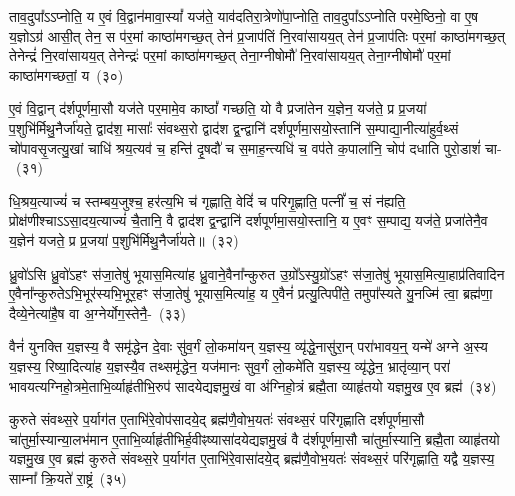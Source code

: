 ताव॒दुपा᳚\-ऽऽ\-प्नोति॒ य ए॒वं वि॒द्वान॑मावा॒स्यां᳚ यज॑ते॒ याव॑दतिरा॒त्रेणो॑पा॒प्नोति॒ ताव॒दुपा᳚\-ऽऽ\-प्नोति परमे॒ष्ठिनो॒ वा ए॒ष य॒ज्ञो\-ऽग्र॑ आसी॒त् तेन॒ स प॑र॒मां काष्ठा॑मगच्छ॒त् तेन॑ प्र॒जा\-प॑तिं नि॒रवा॑सायय॒त् तेन॑ प्र॒जा\-प॑तिः पर॒मां काष्ठा॑मगच्छ॒त् तेनेन्द्रं॑ नि॒रवा॑सायय॒त् तेनेन्द्रः॑ पर॒मां काष्ठा॑मगच्छ॒त् तेना॒ग्नी\-षोमौ॑ नि॒रवा॑सायय॒त् तेना॒ग्नी\-षोमौ॑ पर॒मां काष्ठा॑मगच्छतां॒ य~(३०)\ip

ए॒वं वि॒द्वान् द॑र्\mbox{}शपूर्णमा॒सौ यज॑ते पर॒मामे॒व काष्ठां᳚ गच्छति॒ यो वै प्रजा॑तेन य॒ज्ञेन॒ यज॑ते॒ प्र प्र॒जया॑ प॒शुभि॑र्मिथु॒नैर्जा॑यते॒ द्वाद॑श॒ मासाः᳚ संवथ्स॒रो द्वाद॑श द्व॒न्द्वानि॑ दर्\mbox{}श\-पूर्ण\-मा॒सयो॒स्तानि॑ स॒म्पाद्या॒नीत्या॑हुर्व॒थ्सं चो॑पावसृ॒जत्यु॒खां चाधि॑ श्रय॒त्यव॑ च॒ हन्ति॑ दृ॒षदौ॑ च स॒माह॒न्त्यधि॑ च॒ वप॑ते क॒पाला॑नि॒ चोप॑ दधाति पुरो॒डाशं॑ चा-~(३१)\ip

धि॒श्रय॒त्याज्यं॑ च स्तम्बय॒जुश्च॒ हर॑त्य॒भि च॑ गृह्णाति॒ वेदिं॑ च परिगृ॒ह्णाति॒ पत्नीं᳚ च॒ सं न॑ह्यति॒ प्रोक्ष॑णीश्चा\-ऽऽ\-सा॒दय॒त्याज्यं॑ चै॒तानि॒ वै द्वाद॑श द्व॒न्द्वानि॑ दर्\mbox{}श\-पूर्ण\-मा॒सयो॒स्तानि॒ य ए॒वꣳ स॒म्पाद्य॒ यज॑ते॒ प्रजा॑तेनै॒व य॒ज्ञेन॑ यजते॒ प्र प्र॒जया॑ प॒शुभि॑र्मिथु॒नैर्जा॑यते॥~(३२)\ip

{\anuvakamend[{उ॒क्थ्ये॑नोपा॒प्नोत्य॑गच्छतां॒ यः पु॑रो॒डाशं॑ च चत्वारि॒ꣳ॒शच्च॑}]}

ध्रु॒वो॑\-ऽसि ध्रु॒वो॑\-ऽहꣳ स॑जा॒तेषु॑ भूयास॒मित्या॑ह ध्रु॒वाने॒वैना᳚न्कुरुत उ॒ग्रो᳚\-ऽस्यु॒ग्रो॑\-ऽहꣳ स॑जा॒तेषु॑ भूयास॒मित्या॒हाप्र॑तिवादिन ए॒वैना᳚न्कुरुते\-ऽभि॒भूर॑स्यभि॒भूर॒हꣳ स॑जा॒तेषु॑ भूयास॒मित्या॑ह॒ य ए॒वैनं॑ प्रत्यु॒त्पिपी॑ते॒ तमुपा᳚स्यते यु॒नज्मि॑ त्वा॒ ब्रह्म॑णा॒ दैव्ये॒नेत्या॑है॒ष वा अ॒ग्नेर्योग॒स्तेनै॒-~(३३)\ip

वैनं॑ युनक्ति य॒ज्ञस्य॒ वै समृ॑द्धेन दे॒वाः सु॑व॒र्गं लो॒कमा॑यन् य॒ज्ञस्य॒ व्यृ॑द्धे॒नासु॑रा॒न् परा॑भावय॒न्॒ यन्मे॑ अग्ने अ॒स्य य॒ज्ञस्य॒ रिष्या॒दित्या॑ह य॒ज्ञस्यै॒व तथ्समृ॑द्धेन॒ यज॑मानः सुव॒र्गं लो॒कमे॑ति य॒ज्ञस्य॒ व्यृ॑द्धेन॒ भ्रातृ॑व्या॒न् परा॑ भावयत्यग्नि\-हो॒त्रमे॒ताभि॒र्व्याहृ॑तीभि॒\-रुप॑ सादयेद्यज्ञमु॒खं वा अ॑ग्निहो॒त्रं ब्रह्मै॒ता व्याहृ॑तयो यज्ञमु॒ख ए॒व ब्रह्म॑~(३४)\ip

कुरुते संवथ्स॒रे प॒र्याग॑त ए॒ताभि॑रे॒वोप॑सादये॒द् ब्रह्म॑णै॒वोभ॒यतः॑ संवथ्स॒रं परि॑गृह्णाति दर्\mbox{}श\-पूर्ण\-मा॒सौ चा॑तुर्मा॒स्यान्या॒लभ॑मान ए॒ताभि॒र्व्याहृ॑तीभिर्\mbox{}ह॒वीꣴष्यासा॑द\-येद्यज्ञमु॒खं वै द॑र्\mbox{}शपूर्णमा॒सौ चा॑तुर्मा॒स्यानि॒ ब्रह्मै॒ता व्याहृ॑तयो यज्ञमु॒ख ए॒व ब्रह्म॑ कुरुते संवथ्स॒रे प॒र्याग॑त ए॒ताभि॑रे॒वासा॑द\-ये॒द् ब्रह्म॑णै॒वोभ॒यतः॑ संवथ्स॒रं परि॑गृह्णाति॒ यद्वै य॒ज्ञस्य॒ साम्ना᳚ क्रि॒यते॑ रा॒ष्ट्रं~(३५)\ip


